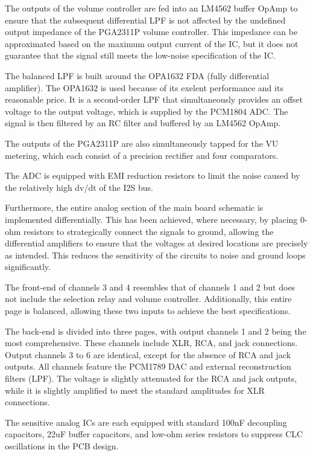The outputs of the volume controller are fed into an LM4562 buffer OpAmp to ensure that the subsequent differential LPF is not affected by the undefined output impedance of the PGA2311P volume controller. This impedance can be approximated based on the maximum output current of the IC, but it does not guarantee that the signal still meets the low-noise specification of the IC.

The balanced LPF is built around the OPA1632 FDA (fully differential amplifier). The OPA1632 is used because of its exelent performance and its reasonable price. It is a second-order LPF that simultaneously provides an offset voltage to the output voltage, which is supplied by the PCM1804 ADC. The signal is then filtered by an RC filter and buffered by an LM4562 OpAmp.

The outputs of the PGA2311P are also simultaneously tapped for the VU metering, which each consist of a precision rectifier and four comparators.

The ADC is equipped with EMI reduction resistors to limit the noise caused by the relatively high dv/dt of the I2S bus.

Furthermore, the entire analog section of the main board schematic is implemented differentially. This has been achieved, where necessary, by placing 0-ohm resistors to strategically connect the signals to ground, allowing the differential amplifiers to ensure that the voltages at desired locations are precisely as intended. 
This reduces the sensitivity of the circuits to noise and ground loops significantly.

The front-end of channels 3 and 4 resembles that of channels 1 and 2 but does not include the selection relay and volume controller. Additionally, this entire page is balanced, allowing these two inputs to achieve the best specifications.

The back-end is divided into three pages, with output channels 1 and 2 being the most comprehensive. These channels include XLR, RCA, and jack connections. Output channels 3 to 6 are identical, except for the absence of RCA and jack outputs. All channels feature the PCM1789 DAC and external reconstruction filters (LPF). The voltage is slightly attenuated for the RCA and jack outputs, while it is slightly amplified to meet the standard amplitudes for XLR connections.

The sensitive analog ICs are each equipped with standard 100nF decoupling capacitors, 22uF buffer capacitors, and low-ohm series resistors to suppress CLC oscillations in the PCB design.

